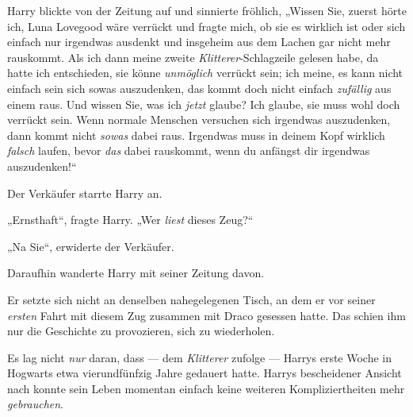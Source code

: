 Harry blickte von der Zeitung auf und sinnierte fröhlich,
„Wissen Sie, zuerst hörte ich, Luna Lovegood wäre verrückt und fragte mich, ob sie es wirklich ist oder sich einfach nur irgendwas ausdenkt und insgeheim aus dem Lachen gar nicht mehr rauskommt. Als ich dann meine zweite \emph{Klitterer}-Schlagzeile gelesen habe, da hatte ich entschieden, sie könne \emph{unmöglich} verrückt sein; ich meine, es kann nicht einfach sein sich sowas auszudenken, das kommt doch nicht einfach \emph{zufällig} aus einem raus. Und wissen Sie, was ich \emph{jetzt} glaube? Ich glaube, sie muss wohl doch verrückt sein. Wenn normale Menschen versuchen sich irgendwas auszudenken, dann kommt nicht \emph{sowas} dabei raus. Irgendwas muss in deinem Kopf wirklich \emph{falsch} laufen, bevor \emph{das} dabei rauskommt, wenn du anfängst dir irgendwas auszudenken!“

Der Verkäufer starrte Harry an.

„Ernsthaft“, fragte Harry.
„Wer \emph{liest} dieses Zeug?“

„Na Sie“, erwiderte der Verkäufer.

Daraufhin wanderte Harry mit seiner Zeitung davon.

Er setzte sich nicht an denselben nahegelegenen Tisch, an dem er vor seiner \emph{ersten} Fahrt mit diesem Zug zusammen mit Draco gesessen hatte. Das schien ihm nur die Geschichte zu provozieren, sich zu wiederholen.

Es lag nicht \emph{nur} daran, dass — dem \emph{Klitterer} zufolge — Harrys erste Woche in Hogwarts etwa vierundfünfzig Jahre gedauert hatte. Harrys bescheidener Ansicht nach konnte sein Leben momentan einfach keine weiteren Kompliziertheiten mehr \emph{gebrauchen}.

